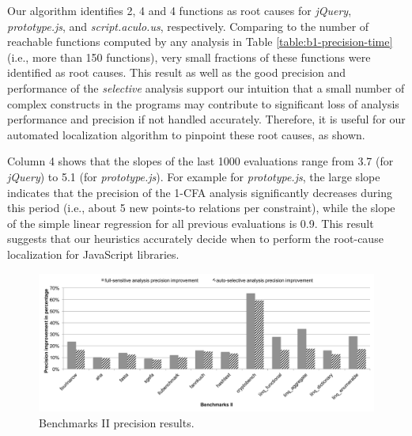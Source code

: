 Our algorithm identifies 2, 4 and 4 functions as root causes for {\it jQuery}, {\it prototype.js}, and {\it script.aculo.us}, respectively. Comparing to the number of reachable functions computed by any analysis in Table \ref{table:b1-precision-time} (i.e., more than 150 functions), very small fractions of these functions were identified as root causes. This result as well as the good precision and performance of the {\it selective} analysis support our intuition that a small number of complex constructs in the programs may contribute to significant loss of analysis performance and precision if not handled accurately. Therefore, it is useful for our automated localization algorithm to pinpoint these root causes, as shown.

Column 4 shows that the slopes of the last 1000 evaluations range from 3.7 (for {\it jQuery}) to 5.1 (for {\it prototype.js}). For example for {\it prototype.js}, the large slope indicates that the precision of the 1-CFA analysis significantly decreases during this period (i.e., about 5 new points-to relations per constraint), while the slope of the simple linear regression for all previous evaluations is 0.9. This result suggests that our heuristics accurately decide when to perform the root-cause localization for JavaScript libraries.



\begin{figure}[th!]
        \includegraphics[width=2\columnwidth]{b2-precision}
\caption{\textmd{Benchmarks II precision results.}}
\vspace{-6pt}
\label{fig:b2-precision}
\end{figure}

